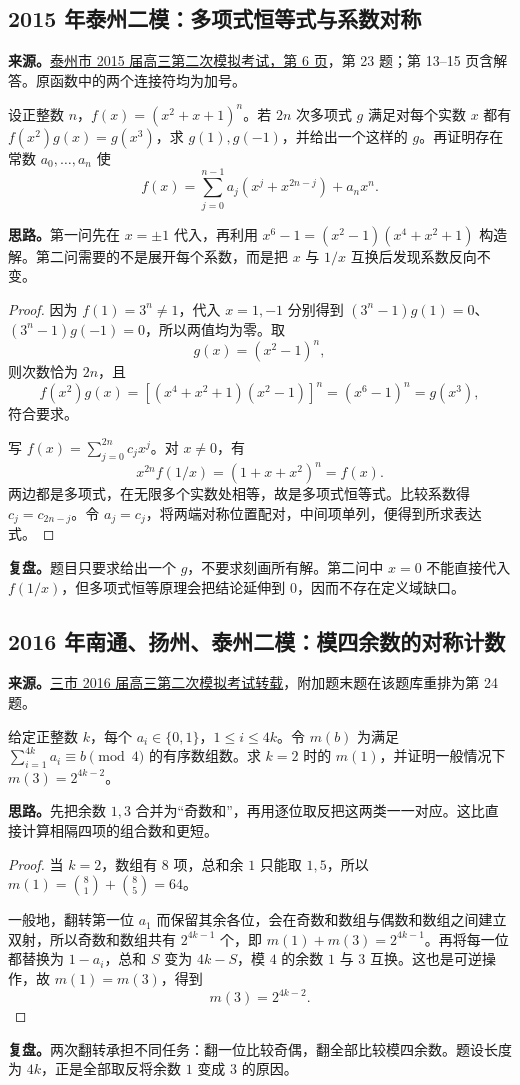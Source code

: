 \documentclass[UTF8]{ctexart}
\begin{document}
\subsection{2015 年泰州二模：多项式恒等式与系数对称}\label{sec:c2015tz2}
\textbf{来源。}\href{https://www.51wendang.com/doc/ade6c3141d94fc4b359d414c/6}{泰州市 2015 届高三第二次模拟考试，第 6 页}，第 23 题；第 13--15 页含解答。原函数中的两个连接符均为加号。
\begin{example}[题意]
设正整数 $n$，$f(x)=(x^2+x+1)^n$。若 $2n$ 次多项式 $g$ 满足对每个实数 $x$ 都有 $f(x^2)g(x)=g(x^3)$，求 $g(1),g(-1)$，并给出一个这样的 $g$。再证明存在常数 $a_0,\ldots,a_n$ 使
\[
f(x)=\sum_{j=0}^{n-1}a_j(x^j+x^{2n-j})+a_nx^n.
\]
\end{example}
\textbf{思路。}第一问先在 $x=\pm1$ 代入，再利用 $x^6-1=(x^2-1)(x^4+x^2+1)$ 构造解。第二问需要的不是展开每个系数，而是把 $x$ 与 $1/x$ 互换后发现系数反向不变。
\begin{proof}
因为 $f(1)=3^n\ne1$，代入 $x=1,-1$ 分别得到 $(3^n-1)g(1)=0$、$(3^n-1)g(-1)=0$，所以两值均为零。取
\[
g(x)=(x^2-1)^n,
\]
则次数恰为 $2n$，且
\[
f(x^2)g(x)=[(x^4+x^2+1)(x^2-1)]^n
=(x^6-1)^n=g(x^3),
\]
符合要求。

写 $f(x)=\sum_{j=0}^{2n}c_jx^j$。对 $x\ne0$，有
\[
x^{2n}f(1/x)=(1+x+x^2)^n=f(x).
\]
两边都是多项式，在无限多个实数处相等，故是多项式恒等式。比较系数得 $c_j=c_{2n-j}$。令 $a_j=c_j$，将两端对称位置配对，中间项单列，便得到所求表达式。
\end{proof}
\textbf{复盘。}题目只要求给出一个 $g$，不要求刻画所有解。第二问中 $x=0$ 不能直接代入 $f(1/x)$，但多项式恒等原理会把结论延伸到 $0$，因而不存在定义域缺口。

\subsection{2016 年南通、扬州、泰州二模：模四余数的对称计数}\label{sec:c2016nty2}
\textbf{来源。}\href{https://www.renrendoc.com/paper/165058812.html}{三市 2016 届高三第二次模拟考试转载}，附加题末题在该题库重排为第 24 题。
\begin{example}[题意]
给定正整数 $k$，每个 $a_i\in\{0,1\}$，$1\leq i\leq4k$。令 $m(b)$ 为满足 $\sum_{i=1}^{4k}a_i\equiv b\pmod4$ 的有序数组数。求 $k=2$ 时的 $m(1)$，并证明一般情况下 $m(3)=2^{4k-2}$。
\end{example}
\textbf{思路。}先把余数 $1,3$ 合并为“奇数和”，再用逐位取反把这两类一一对应。这比直接计算相隔四项的组合数和更短。
\begin{proof}
当 $k=2$，数组有 $8$ 项，总和余 $1$ 只能取 $1,5$，所以 $m(1)=\binom81+\binom85=64$。

一般地，翻转第一位 $a_1$ 而保留其余各位，会在奇数和数组与偶数和数组之间建立双射，所以奇数和数组共有 $2^{4k-1}$ 个，即 $m(1)+m(3)=2^{4k-1}$。再将每一位都替换为 $1-a_i$，总和 $S$ 变为 $4k-S$，模 $4$ 的余数 $1$ 与 $3$ 互换。这也是可逆操作，故 $m(1)=m(3)$，得到
\[
\boxed{m(3)=2^{4k-2}}.
\]
\end{proof}
\textbf{复盘。}两次翻转承担不同任务：翻一位比较奇偶，翻全部比较模四余数。题设长度为 $4k$，正是全部取反将余数 $1$ 变成 $3$ 的原因。
\end{document}

